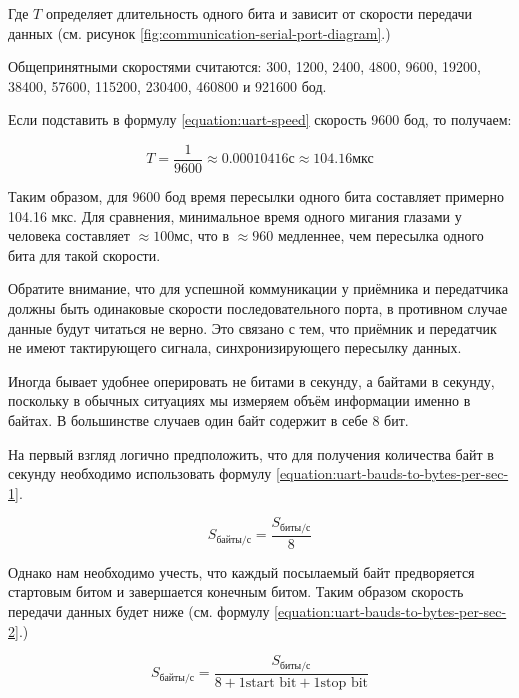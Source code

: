 \documentclass[../sparc.tex]{subfiles}
\begin{document}
Где $T$ определяет длительность одного бита и зависит от скорости передачи
данных (см. рисунок \ref{fig:communication-serial-port-diagram}.)

Общепринятными скоростями считаются: 300, 1200, 2400, 4800, 9600, 19200, 38400,
57600, 115200, 230400, 460800 и 921600 бод.

Если подставить в формулу \ref{equation:uart-speed} скорость 9600 бод, то получаем:

\begin{equation}
  T = \frac{1}{9600} \approx 0.00010416 \mbox{с} \approx 104.16 \mbox{мкс}
\end{equation}

Таким образом, для 9600 бод время пересылки одного бита составляет примерно
104.16 мкс.  Для сравнения, минимальное время одного мигания глазами у человека
составляет $\approx100 \mbox{мс}$\cite{chudler}, что в $\approx960$ медленнее,
чем пересылка одного бита для такой скорости.

Обратите внимание, что для успешной коммуникации у приёмника и передатчика
должны быть одинаковые скорости последовательного порта, в противном случае
данные будут читаться не верно.  Это связано с тем, что приёмник и передатчик не
имеют тактирующего сигнала, синхронизирующего пересылку данных.

Иногда бывает удобнее оперировать не битами в секунду, а байтами в секунду,
поскольку в обычных ситуациях мы измеряем объём информации именно в байтах. В
большинстве случаев один байт содержит в себе 8 бит.

На первый взгляд логично предположить, что для получения количества байт в
секунду необходимо использовать формулу
\ref{equation:uart-bauds-to-bytes-per-sec-1}.

\begin{equation}
  S_{\mbox{байты/с}} = \frac{S_{\mbox{биты/с}}}{8}
  \label{equation:uart-bauds-to-bytes-per-sec-1}
\end{equation}

Однако нам необходимо учесть, что каждый посылаемый байт предворяется стартовым
битом и завершается конечным битом.  Таким образом скорость передачи данных
будет ниже (см. формулу \ref{equation:uart-bauds-to-bytes-per-sec-2}.)

\begin{equation}
  S_{\mbox{байты/с}} = \frac{S_{\mbox{биты/с}}}{8 + 1 \mbox{start bit} + 1 \mbox{stop bit}}
  \label{equation:uart-bauds-to-bytes-per-sec-2}
\end{equation}
\end{document}
